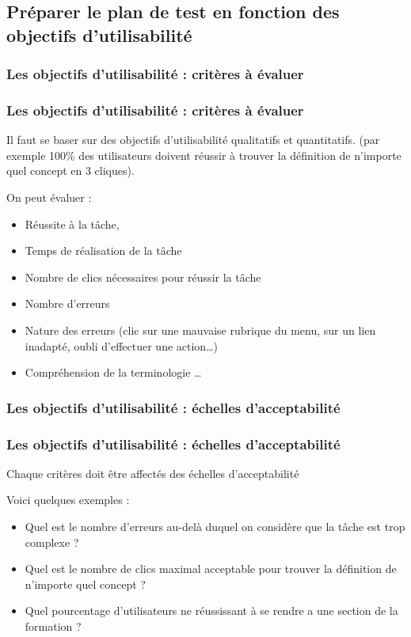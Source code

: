 	\subsection{Préparer le plan de test en fonction des objectifs d'utilisabilité} 
	\subsubsection{Les objectifs d'utilisabilité : critères à évaluer} 

		\begin{frame}[allowframebreaks]
			\frametitle{Les objectifs d'utilisabilité : critères à évaluer}
			Il faut se baser sur des objectifs d'utilisabilité qualitatifs et quantitatifs. (par exemple 100\% des utilisateurs doivent réussir à trouver la définition de n'importe quel concept en 3 cliques). 
			\par
			On peut évaluer : 
			\begin {itemize}
				      \item Réussite à la tâche,
				      \item Temps de réalisation de la tâche
				      \item Nombre de clics nécessaires pour réussir la tâche
				      \item Nombre d'erreurs
				      \item Nature des erreurs (clic sur une mauvaise rubrique du menu, sur un lien inadapté, oubli d'effectuer une action…)
				      \item Compréhension de la terminologie …
			\end{itemize}
		\end{frame}      
		
		  \subsubsection{Les objectifs d'utilisabilité : échelles d'acceptabilité} 

		\begin{frame}[allowframebreaks]
			\frametitle{Les objectifs d'utilisabilité : échelles d'acceptabilité}
			Chaque critères doit être affectés des échelles d'acceptabilité
			\par
			Voici quelques exemples : 
			\begin {itemize}
				      \item Quel est le nombre d'erreurs au-delà duquel on considère que la tâche est trop complexe ?
				      \item Quel est le nombre de clics maximal acceptable pour trouver la définition de n'importe quel concept ?
					\item Quel pourcentage d'utilisateurs ne réussissant à se rendre a une section de la formation ? 
			\end{itemize}
		\end{frame} 
